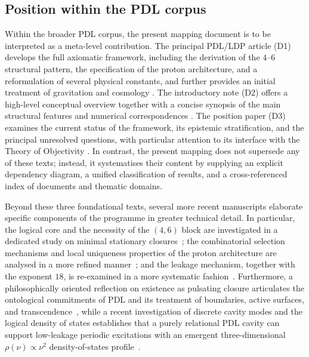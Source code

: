 \documentclass{article}
\begin{document}
\subsection{Position within the PDL corpus}
\label{subsec:position_corpus}

Within the broader PDL corpus, the present mapping document is to be interpreted as a meta-level contribution. The principal PDL/LDP article (D1) develops the full axiomatic framework, including the derivation of the $4$–$6$ structural pattern, the specification of the proton architecture, and a reformulation of several physical constants, and further provides an initial treatment of gravitation and cosmology \citep{PDL_Main_2026}. The introductory note (D2) offers a high-level conceptual overview together with a concise synopsis of the main structural features and numerical correspondences \citep{PDL_intro}. The position paper (D3) examines the current status of the framework, its epistemic stratification, and the principal unresolved questions, with particular attention to its interface with the Theory of Objectivity \citep{PDL_position}. In contrast, the present mapping does not supersede any of these texts; instead, it systematises their content by supplying an explicit dependency diagram, a unified classification of results, and a cross-referenced index of documents and thematic domains.

Beyond these three foundational texts, several more recent manuscripts elaborate specific components of the programme in greater technical detail. In particular, the logical core and the necessity of the $(4,6)$ block are investigated in a dedicated study on minimal stationary closures~\citep{Minimal_Stationary_Closures_2026}; the combinatorial selection mechanisms and local uniqueness properties of the proton architecture are analysed in a more refined manner~\citep{Proton_Local_Uniqueness_2026,Combinatorial_Proton_v2_2026}; and the leakage mechanism, together with the exponent $18$, is re-examined in a more systematic fashion~\citep{Coherence_Leakage_18_2026,Exponent_18_PDL_2026}. Furthermore, a philosophically oriented reflection on existence as pulsating closure articulates the ontological commitments of PDL and its treatment of boundaries, active surfaces, and transcendence~\citep{ExistencePulsatingClosure2026}, while a recent investigation of discrete cavity modes and the logical density of states establishes that a purely relational PDL cavity can support low-leakage periodic excitations with an emergent three-dimensional $\rho(\nu)\propto \nu^2$ density-of-states profile~\citep{PDLCavityModes2026}.
\end{document}
